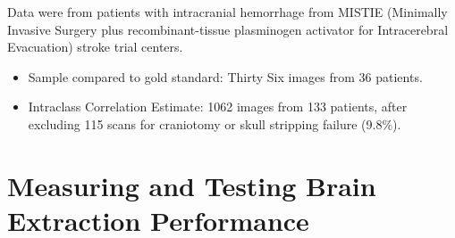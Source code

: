 \documentclass[final]{beamer}\usepackage[]{graphicx}\usepackage[]{color}
\begin{document}
\begin{frame}[fragile]
\begin{minipage}{0.39\linewidth}
\begin{multicols}{2}
\vfill
\columnbreak




Data were from patients with intracranial hemorrhage from MISTIE (Minimally Invasive Surgery plus recombinant-tissue plasminogen activator for Intracerebral Evacuation) stroke trial centers.
\begin{itemize}
\item Sample compared to gold standard: Thirty Six images from 36 patients. 
\item Intraclass Correlation Estimate: 1062 images from 133 patients, after excluding 115 scans for craniotomy or skull stripping failure (9.8\%).  
\end{itemize}
\end{multicols}
%



\section{Measuring and Testing Brain Extraction Performance}









\end{minipage}
\end{frame}
\end{document}
